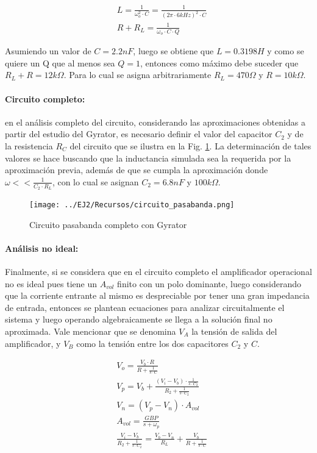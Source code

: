 \begin{align*}
    & L = \frac{1}{\omega_o^{2} \cdot C} = \frac{1}{(2 \pi \cdot 6kHz )^{2} \cdot C} \\
    & R + R_L = \frac{1}{\omega_o \cdot C \cdot Q}
\end{align*}

Asumiendo un valor de $C = 2.2nF$, luego se obtiene que $L = 0.3198H$ y como se quiere un Q que al menos sea $Q = 1$, entonces como m\'aximo debe suceder que
$R_L + R = 12k\Omega$. Para lo cual se asigna arbitrariamente $R_L = 470 \Omega$ y $R = 10k\Omega$.

\paragraph*{Circuito completo:} en el an\'alisis completo del circuito, considerando las aproximaciones obtenidas a partir del estudio del Gyrator, es necesario definir el valor del capacitor
$C_2$ y de la resistencia $R_C$ del circuito que se ilustra en la Fig. \ref{fig:circuito_pasabanda}. La determinaci\'on de tales valores se hace buscando que la inductancia simulada sea la requerida por la aproximaci\'on previa,
adem\'as de que se cumpla la aproximaci\'on donde $\omega << \frac{1}{C_2 \cdot R_L}$, con lo cual se asignan $C_2 = 6.8nF$ y $100k\Omega$.

\begin{figure}[H]
    \centering
    \texttt{[image: ../EJ2/Recursos/circuito\_pasabanda.png]}
    \caption{Circuito pasabanda completo con Gyrator}
    \label{fig:circuito_pasabanda}
\end{figure}

\paragraph*{An\'alisis no ideal:} Finalmente, si se considera que en el circuito completo el amplificador operacional no es ideal pues tiene un $A_{vol}$ finito con un polo dominante, luego considerando que la corriente entrante al mismo es despreciable por tener
una gran impedancia de entrada, entonces se plantean ecuaciones para analizar circuitalmente el sistema y luego operando algebraicamente se llega a la soluci\'on final no aproximada. Vale mencionar que se denomina $V_A$ la tensi\'on de salida del amplificador,
y $V_B$ como la tensi\'on entre los dos capacitores $C_2$ y $C$.

\begin{align}
    & V_o = \frac{V_b \cdot R}{R + \frac{1}{s \cdot C}} \\
    & V_p = V_b + \frac{(V_i - V_b) \cdot \frac{1}{s \cdot C_2}}{R_2 + \frac{1}{s \cdot C_2}} \\
    & V_n = (V_p - V_n) \cdot A_{vol} \\
    & A_{vol} = \frac{GBP}{s + \omega_p} \\
    & \frac{V_i - V_b}{R_2 + \frac{1}{s \cdot C_2}} = \frac{V_b - V_n}{R_L} + \frac{V_b}{R + \frac{1}{s \cdot C}}
\end{align}

